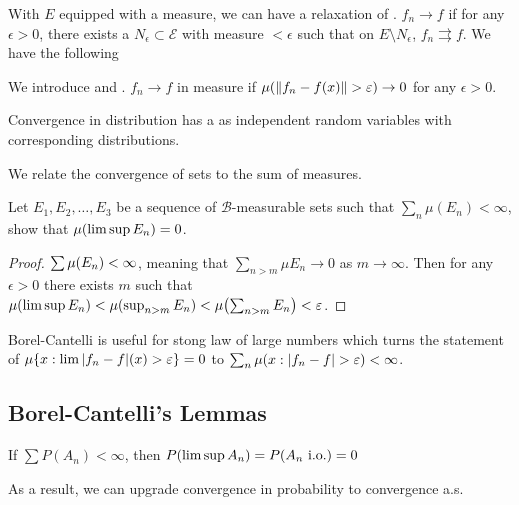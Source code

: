 With \(E\) equipped with a measure, we can have a relaxation of . \(f_{n} \to f\)  if for any \(\epsilon> 0\), there exists a \(N_{\epsilon} \subset \mathcal{E}\) with measure \(< \epsilon\) such that on \(E\setminus N_{\epsilon}\), \(f_{n} \rightrightarrows f\). We have the following

We introduce  and . \(f_{n} \to f\) in measure if \(\mu\pqty{\norm{f_{n} - f(x)} > \epsilon} \to 0\) for any \(\epsilon > 0\).

Convergence in distribution has a  as independent random variables with corresponding distributions. 

We relate the convergence of sets to the sum  of measures. 
\begin{thm}
    Let \(E_{1}, E_{2},\dots,E_{3}\) be a sequence of \(\mathcal{B}\)-measurable sets such that \(\sum_{n} \mu(E_{n}) < \infty\), show that \(\mu\pqty{\limsup E_{n}} = 0\). 
\end{thm}
\begin{proof}
    \(\sum \mu \pqty{E_{n}} < \infty\), meaning that \(\sum_{n > m} \mu E_{n} \to 0\) as \(m\to \infty\). Then for any \(\epsilon>0\) there exists \(m\) such that \(\mu\pqty{\limsup E_{n}} < \mu \pqty{\sup_{n>m} E_{n}} < \mu \pqty{\sum_{n>m} E_{n}} < \epsilon\). 
\end{proof}
\begin{remark}
    Borel-Cantelli is useful for stong law of large numbers which turns the statement of \(\mu\Bqty{x: \lim \abs{f_{n} - f} (x) > \epsilon} = 0\) to \(\sum_{n} \mu\pqty{x: \abs{f_{n} - f} > \epsilon} < \infty\). 
\end{remark}

\subsection{Borel-Cantelli's Lemmas}

\begin{thm}
    If \(\sum P(A_{n})< \infty\), then \(P\pqty{\limsup A_{n}} = P\pqty{A_{n} \text{ i.o.}} =0 \)
\end{thm}

As a result, we can upgrade convergence in probability to convergence a.s. 

